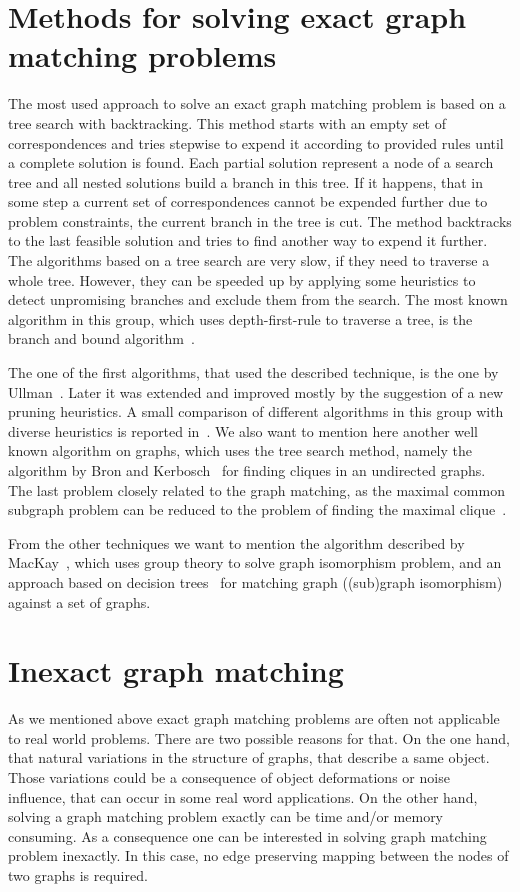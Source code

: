 \section{Methods for solving exact graph matching problems}
The most used approach to solve an exact graph matching problem is based on a tree search with backtracking. This method starts with an empty set of correspondences and tries stepwise to expend it according to provided rules until a complete solution is found. Each partial solution represent a node of a search tree and all nested solutions build a branch in this tree. If it happens, that in some step a current set of correspondences cannot be expended further due to problem constraints, the current branch in the tree is cut. The method backtracks to the last feasible solution and tries to find another way to expend it further. The algorithms based on a tree search are very slow, if they need to traverse a whole tree. However, they can be speeded up by applying some heuristics to detect unpromising branches and exclude them from the search. The most known algorithm in this group, which uses depth-first-rule to traverse a tree, is the branch and bound algorithm~\cite{Reingold}.

The one of the first algorithms, that used the described technique, is the one by Ullman~\cite{Ullmann}. Later it was extended and improved mostly by the suggestion of a new pruning heuristics. A small comparison of different algorithms in this group with diverse heuristics is reported in~\cite{Lee2013}. We also want to mention here another well known algorithm on graphs, which uses the tree search method, namely the algorithm by Bron and Kerbosch~\cite{BronKerbosch} for finding cliques in an undirected graphs. The last problem closely related to the graph matching, as the maximal common subgraph problem can be reduced to the problem of finding the maximal clique~.

From the other techniques we want to mention the algorithm described by MacKay~\cite{McKay}, which uses group theory to solve graph isomorphism problem, and an approach based on decision trees~\cite{Messmer1999,Shearer2001,Shearer1998} for matching graph ((sub)graph isomorphism) against a set of graphs.
\section{Inexact graph matching}
As we mentioned above exact graph matching problems are often not applicable to real world problems. There are two possible reasons for that. On the one hand, that  natural variations in the structure of graphs, that describe a same object. Those variations could be a consequence of object deformations or noise influence, that can occur in some real word applications. On the other hand, solving a graph matching problem exactly can be time and/or memory consuming. As a consequence one can be interested in solving graph matching problem inexactly. In this case, no edge preserving mapping between the nodes of two graphs is required.

